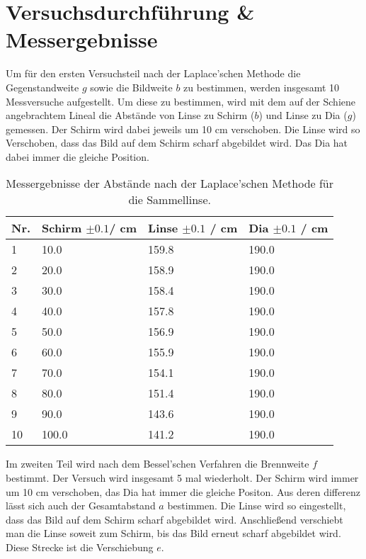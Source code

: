 \documentclass[12pt,a4paper,twoside]{article}
\begin{document}
\section{Versuchsdurchführung \& Messergebnisse} %
Um für den ersten Versuchsteil nach der Laplace'schen Methode die Gegenstandweite $g$ sowie die Bildweite $b$ zu bestimmen, werden insgesamt 10 Messversuche aufgestellt. 
Um diese zu bestimmen, wird mit dem auf der Schiene angebrachtem Lineal die Abstände von Linse zu Schirm ($b$) und Linse zu Dia ($g$) gemessen. 
Der Schirm wird dabei jeweils um 10 cm verschoben. Die Linse wird so Verschoben, dass das Bild auf dem Schirm scharf abgebildet wird. Das Dia hat dabei immer die gleiche Position. 

\begin{table}[H]
    \centering
    \caption{Messergebnisse der Abstände nach der Laplace'schen Methode für die Sammellinse. }
    \label{tab:messergebnisse Laplace}
    \begin{tabular}{| l | l | l | l |}
        \hline
        Nr.  & Schirm $\pm 0.1 $/ cm & Linse $\pm 0.1 $ / cm & Dia $\pm 0.1 $ / cm \\
        \hline
        1  & 10.0   & 159.8  & 190.0 \\
        2  & 20.0   & 158.9  & 190.0 \\
        3  & 30.0   & 158.4  & 190.0 \\
        4  & 40.0   & 157.8  & 190.0 \\
        5  & 50.0   & 156.9  & 190.0 \\
        6  & 60.0   & 155.9  & 190.0 \\
        7  & 70.0   & 154.1  & 190.0 \\
        8  & 80.0   & 151.4  & 190.0 \\
        9  & 90.0   & 143.6  & 190.0 \\
        10 & 100.0  & 141.2  & 190.0 \\
        \hline
    \end{tabular}
\end{table}

\noindent
Im zweiten Teil wird nach dem Bessel'schen Verfahren die Brennweite $f$ bestimmt. 
Der Versuch wird insgesamt 5 mal wiederholt. Der Schirm wird immer um 10 cm verschoben, das Dia hat immer die gleiche Positon. Aus deren differenz lässt sich auch der Gesamtabstand $a$ bestimmen. 
Die Linse wird so eingestellt, dass das Bild auf dem Schirm scharf abgebildet wird. Anschließend verschiebt man die Linse soweit zum Schirm, bis das Bild erneut scharf abgebildet wird. Diese Strecke ist die Verschiebung $e$. 
\end{document}
